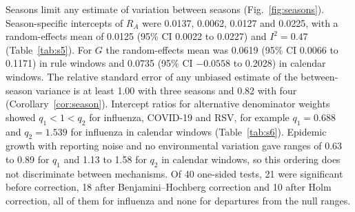 Seasons limit any estimate of variation between seasons (Fig.~\ref{fig:seasons}). Season-specific intercepts of $R_A$ were 0.0137, 0.0062, 0.0127 and 0.0225, with a random-effects mean of 0.0125 (95\% CI 0.0022 to 0.0227) and $I^2=0.47$ (Table~\ref{tab:s5}). For $G$ the random-effects mean was 0.0619 (95\% CI 0.0066 to 0.1171) in rule windows and 0.0735 (95\% CI $-0.0558$ to 0.2028) in calendar windows. The relative standard error of any unbiased estimate of the between-season variance is at least 1.00 with three seasons and 0.82 with four (Corollary~\ref{cor:season}). Intercept ratios for alternative denominator weights showed $q_1<1<q_2$ for influenza, COVID-19 and RSV, for example $q_1=0.688$ and $q_2=1.539$ for influenza in calendar windows (Table~\ref{tab:s6}). Epidemic growth with reporting noise and no environmental variation gave ranges of 0.63 to 0.89 for $q_1$ and 1.13 to 1.58 for $q_2$ in calendar windows, so this ordering does not discriminate between mechanisms. Of 40 one-sided tests, 21 were significant before correction, 18 after Benjamini--Hochberg correction and 10 after Holm correction, all of them for influenza and none for departures from the null ranges.
